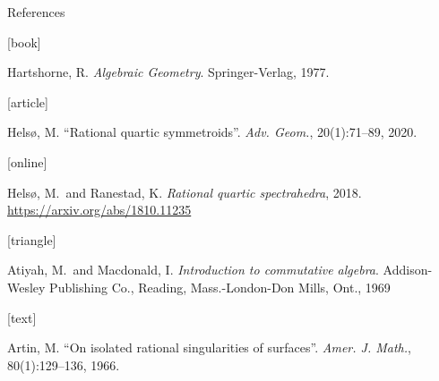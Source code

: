 \documentclass[UKenglish,aspectratio=169,logotop]{beamer}
\begin{document}
\begin{frame}[allowframebreaks]{References}
    \begin{thebibliography}{}

        [book]

        Hartshorne, R.
        \newblock \emph{Algebraic Geometry}.
        \newblock Springer-Verlag, 1977.

        [article]

        Helsø, M.
        \newblock \enquote{Rational quartic symmetroids}.
        \newblock \emph{Adv. Geom.}, 20(1):71--89, 2020.

        [online]

        Helsø, M.\ and Ranestad, K.
        \newblock \emph{Rational quartic spectrahedra}, 2018.
        \newblock \url{https://arxiv.org/abs/1810.11235}

        [triangle]

        Atiyah, M.\ and Macdonald, I.
        \newblock \emph{Introduction to commutative algebra}.
        \newblock Addison-Wesley Publishing Co., Reading, Mass.-London-Don
        Mills, Ont., 1969

        [text]

        Artin, M.
        \newblock \enquote{On isolated rational singularities of surfaces}.
        \newblock \emph{Amer. J. Math.}, 80(1):129--136, 1966.

    \end{thebibliography}
\end{frame}
\end{document}
